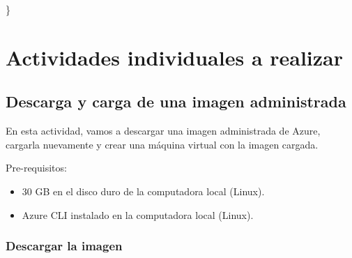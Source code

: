 \}

\chapter{Actividades individuales a realizar}

\section{Descarga y carga de una imagen administrada}

En esta actividad, vamos a descargar una imagen administrada de Azure, cargarla nuevamente y crear una máquina virtual con la imagen cargada.

Pre-requisitos:

\begin{itemize}
\item 30 GB en el disco duro de la computadora local (Linux).
\item Azure CLI instalado en la computadora local (Linux).
\end{itemize}

\subsection{Descargar la imagen}


